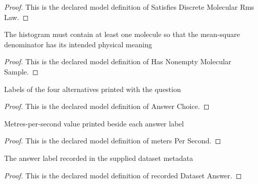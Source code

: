 \begin{proof}
  This is the declared model definition of Satisfies Discrete Molecular Rms Law.
\end{proof}
\begin{definition}
  \label{def:physics:phyx-mini-0378:phyxminiproblems-problemphyxmini0378-hasnonemptymolecularsample}
  The histogram must contain at least one molecule so that the mean-square denominator has its intended physical meaning
\end{definition}
\begin{proof}
  This is the declared model definition of Has Nonempty Molecular Sample.
\end{proof}
\begin{definition}
  \label{def:physics:phyx-mini-0378:phyxminiproblems-problemphyxmini0378-answerchoice}
  Labels of the four alternatives printed with the question
\end{definition}
\begin{proof}
  This is the declared model definition of Answer Choice.
\end{proof}
\begin{definition}
  \label{def:physics:phyx-mini-0378:phyxminiproblems-problemphyxmini0378-answerchoice-meterspersecond}
  Metres-per-second value printed beside each answer label
\end{definition}
\begin{proof}
  This is the declared model definition of meters Per Second.
\end{proof}
\begin{definition}
  \label{def:physics:phyx-mini-0378:phyxminiproblems-problemphyxmini0378-recordeddatasetanswer}
  The answer label recorded in the supplied dataset metadata
\end{definition}
\begin{proof}
  This is the declared model definition of recorded Dataset Answer.
\end{proof}
